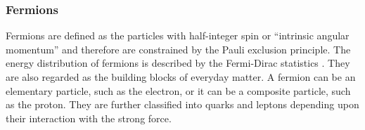 \subsubsection{Fermions}%
\label{sec:theory:standardmodel:fundamentalparticles:fermions}

Fermions are defined as the particles with half-integer spin or \enquote{intrinsic angular momentum} and therefore are constrained by the Pauli exclusion principle. The energy distribution of fermions is described by the Fermi-Dirac statistics \cite{thomson}. They are also regarded as the building blocks of everyday matter. A fermion can be an elementary particle, such as the electron, or it can be a composite particle, such as the proton. They are further classified into quarks and leptons depending upon their interaction with the strong force.


